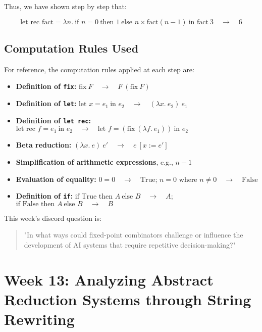 \documentclass{article}
\begin{document}
Thus, we have shown step by step that:

\begin{equation*}
\text{let rec }\text{fact} = \lambda n.\ \text{if } n = 0\ \text{then } 1\ \text{else } n \times \text{fact}(n - 1)\ \text{in }\text{fact}\ 3\quad \to\quad 6
\end{equation*}

\subsection*{Computation Rules Used}

For reference, the computation rules applied at each step are:

\begin{itemize}
    \item \textbf{Definition of \texttt{fix}:} $\text{fix}\ F\quad \to\quad F\ (\text{fix}\ F)$
    \item \textbf{Definition of \texttt{let}:} $\text{let } x = e_1\ \text{in } e_2\quad \to\quad (\lambda x.\ e_2)\ e_1$
    \item \textbf{Definition of \texttt{let rec}:} $\text{let rec } f = e_1\ \text{in } e_2\quad \to\quad \text{let } f = (\text{fix}\ (\lambda f.\ e_1))\ \text{in } e_2$
    \item \textbf{Beta reduction:} $(\lambda x.\ e)\ e'\quad \to\quad e\ [x := e']$
    \item \textbf{Simplification of arithmetic expressions}, e.g., $n - 1$
    \item \textbf{Evaluation of equality:} $0 = 0\quad \to\quad \text{True}$; $n = 0$ where $n \neq 0\quad \to\quad \text{False}$
    \item \textbf{Definition of \texttt{if}:} $\text{if True then } A\ \text{else } B\quad \to\quad A$; $\text{if False then } A\ \text{else } B\quad \to\quad B$
\end{itemize}

This week's discord question is:

\begin{quote}
\small
"In what ways could fixed-point combinators challenge or influence the development of AI systems that require repetitive decision-making?"
\end{quote}

\section{Week 13: Analyzing Abstract Reduction Systems through String Rewriting}
\label{sec:week13}
\end{document}
